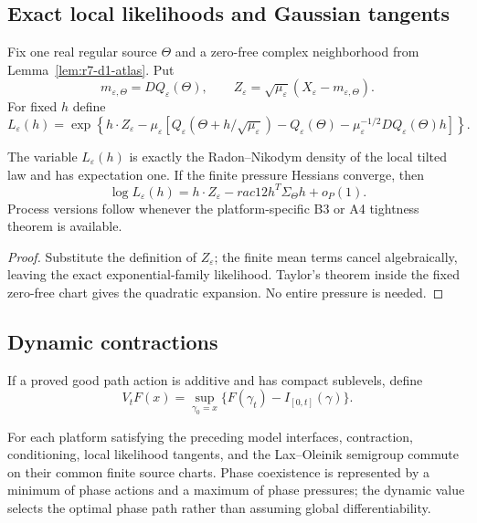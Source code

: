 \subsection{Exact local likelihoods and Gaussian tangents}

Fix one real regular source $\Theta$ and a zero-free complex neighborhood from
Lemma~\ref{lem:r7-d1-atlas}.  Put
\[
 m_{\varepsilon,\Theta}=DQ_\varepsilon(\Theta),
 \qquad
 Z_\varepsilon=\sqrt{\mu_\varepsilon}
 (X_\varepsilon-m_{\varepsilon,\Theta}).
\]
For fixed $h$ define
\[
 L_\varepsilon(h)=
 \exp\left\{
 h\cdot Z_\varepsilon
 -\mu_\varepsilon\left[
 Q_\varepsilon(\Theta+h/\sqrt{\mu_\varepsilon})
 -Q_\varepsilon(\Theta)
 -\mu_\varepsilon^{-1/2}DQ_\varepsilon(\Theta)h
 \right]\right\}.
\]

\begin{theorem}
\label{thm:r7-d1-likelihood}
The variable $L_\varepsilon(h)$ is exactly the Radon--Nikodym density of the
local tilted law and has expectation one.  If the finite pressure Hessians
converge, then
\[
 \log L_\varepsilon(h)
 =h\cdot Z_\varepsilon-rac12h^T\Sigma_\Theta h+o_P(1).
\]
Process versions follow whenever the platform-specific B3 or A4 tightness
theorem is available.
\end{theorem}

\begin{proof}
Substitute the definition of $Z_\varepsilon$; the finite mean terms cancel
algebraically, leaving the exact exponential-family likelihood.  Taylor's
theorem inside the fixed zero-free chart gives the quadratic expansion.  No
entire pressure is needed.
\end{proof}

\subsection{Dynamic contractions}

If a proved good path action is additive and has compact sublevels, define
\[
 V_tF(x)=\sup_{\gamma_0=x}
 \{F(\gamma_t)-I_{[0,t]}(\gamma)\}.
\]

\begin{theorem}
\label{thm:r7-d1-dynamic}
For each platform satisfying the preceding model interfaces, contraction,
conditioning, local likelihood tangents, and the Lax--Oleinik semigroup commute
on their common finite source charts.  Phase coexistence is represented by a
minimum of phase actions and a maximum of phase pressures; the dynamic value
selects the optimal phase path rather than assuming global differentiability.
\end{theorem}

